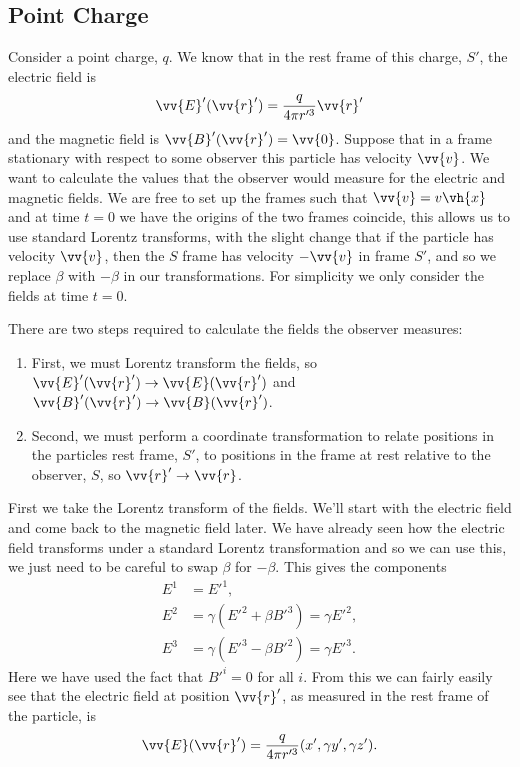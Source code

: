 \subsection{Point Charge}
\label{sec:point charge}
Consider a point charge, \(q\).
We know that in the rest frame of this charge, \(S'\), the electric field is
\begin{equation}
    \vv{E}'(\vv{r}') = \frac{q}{4\pi r'^3} \vv{r}'
\end{equation}
and the magnetic field is \(\vv{B}'(\vv{r}') = \vv{0}\).
Suppose that in a frame stationary with respect to some observer this particle has velocity \(\vv{v}\).
We want to calculate the values that the observer would measure for the electric and magnetic fields.
We are free to set up the frames such that \(\vv{v} = v\vh{x}\) and at time \(t = 0\) we have the origins of the two frames coincide, this allows us to use standard Lorentz transforms, with the slight change that if the particle has velocity \(\vv{v}\), then the \(S\) frame has velocity \(-\vv{v}\) in frame \(S'\), and so we replace \(\beta\) with \(-\beta\) in our transformations.
For simplicity we only consider the fields at time \(t = 0\).

There are two steps required to calculate the fields the observer measures:
\begin{enumerate}
    \item First, we must Lorentz transform the fields, so \(\vv{E}'(\vv{r}') \to \vv{E}(\vv{r}')\) and \(\vv{B}'(\vv{r}') \to \vv{B}(\vv{r}')\).
    \item Second, we must perform a coordinate transformation to relate positions in the particles rest frame, \(S'\), to positions in the frame at rest relative to the observer, \(S\), so \(\vv{r}' \to \vv{r}\).
\end{enumerate}

First we take the Lorentz transform of the fields.
We'll start with the electric field and come back to the magnetic field later.
We have already seen how the electric field transforms under a standard Lorentz transformation and so we can use this, we just need to be careful to swap \(\beta\) for \(-\beta\).
This gives the components
\begin{align}
    E^1 &= E'^1,\\
    E^2 &= \gamma(E'^2 + \beta B'^3) = \gamma E'^2,\\
    E^3 &= \gamma(E'^3 - \beta B'^2) = \gamma E'^3.
\end{align}
Here we have used the fact that \(B'^i = 0\) for all \(i\).
From this we can fairly easily see that the electric field at position \(\vv{r}'\), as measured in the rest frame of the particle, is
\begin{equation}
    \vv{E}(\vv{r}') = \frac{q}{4\pi r'^3}(x', \gamma y', \gamma z').
\end{equation}


